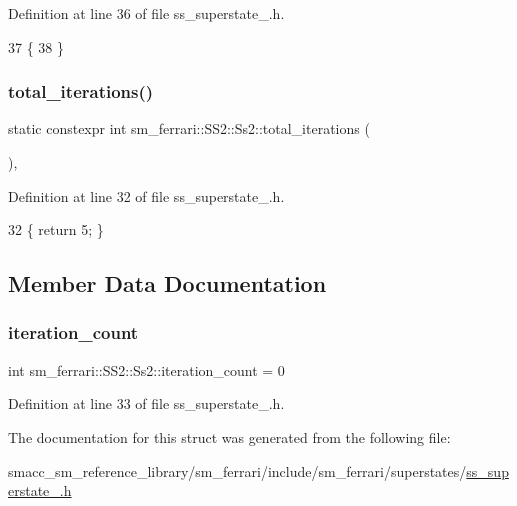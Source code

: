 Definition at line 36 of file ss\+\_\+superstate\+\_.\+h.


\begin{DoxyCode}
37     \{
38     \}
\end{DoxyCode}
\mbox{\label{structsm__ferrari_1_1SS2_1_1Ss2_ad33ee99bf902dc7939953cb3d8bc6a9d}} 
\subsubsection{\texorpdfstring{total\+\_\+iterations()}{total\_iterations()}}
{\footnotesize\ttfamily static constexpr int sm\+\_\+ferrari\+::\+S\+S2\+::\+Ss2\+::total\+\_\+iterations (\begin{DoxyParamCaption}{ }\end{DoxyParamCaption})\hspace{0.3cm}{\ttfamily [inline]}, {\ttfamily [static]}}



Definition at line 32 of file ss\+\_\+superstate\+\_.\+h.


\begin{DoxyCode}
32 \{ \textcolor{keywordflow}{return} 5; \}
\end{DoxyCode}


\subsection{Member Data Documentation}
\mbox{\label{structsm__ferrari_1_1SS2_1_1Ss2_a7b04c19b3a2be3ad9fdcaee06682bd33}} 
\subsubsection{\texorpdfstring{iteration\+\_\+count}{iteration\_count}}
{\footnotesize\ttfamily int sm\+\_\+ferrari\+::\+S\+S2\+::\+Ss2\+::iteration\+\_\+count = 0}



Definition at line 33 of file ss\+\_\+superstate\+\_.\+h.



The documentation for this struct was generated from the following file\+:\begin{DoxyCompactItemize}
\item 
smacc\+\_\+sm\+\_\+reference\+\_\+library/sm\+\_\+ferrari/include/sm\+\_\+ferrari/superstates/\hyperlink{sm__ferrari_2include_2sm__ferrari_2superstates_2ss__superstate__2_8h}{ss\+\_\+superstate\+\_.\+h}\end{DoxyCompactItemize}
